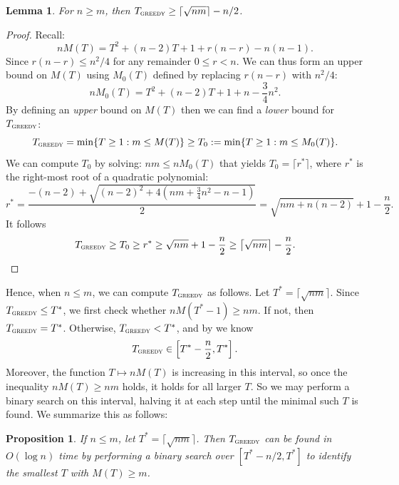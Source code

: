\documentclass{article}
\newcommand{\gr}{\textsc{greedy}}
\newtheorem{lemma}{Lemma}
\newtheorem{proposition}{Proposition}
\begin{document}
\begin{lemma}\label{l: tooth upper sharp}
    For $n \ge m$, then $T_\gr \ge \left\lceil \sqrt{nm}\right\rceil - n/2$.
\end{lemma}
\begin{proof}
    Recall:
    \[
    nM(T) = T^2 + (n-2)T + 1 + r(n-r) - n(n-1).
    \]
    Since $r(n-r) \le n^2/4$ for any remainder $0 \le r < n$. We can thus form an upper bound on $M(T)$ using $M_0(T)$ defined by replacing $r(n-r)$ with $n^2/4$:
    \[
    n M_0(T) = T^2 + (n-2)T + 1 + n - \frac34 n^2.
    \]
    By defining an \textit{upper} bound on $M(T)$ then we can find a \textit{lower} bound for $T_\gr$:
    \begin{equation*}
        T_{\gr} = \min\{T \ge 1: m \le M(T)\} \ge T_0 := \min\{T \ge 1: m \le M_0(T)\}.
    \end{equation*}
We can compute $T_0$ by solving: $nm \le n M_0(T)$ that yields $T_0 = \lceil r^*\rceil$, where $r^*$ is the right-most root of a quadratic polynomial:
\begin{equation*}
    r^* = \frac{-(n-2) + \sqrt{(n-2)^2 + 4(nm + \frac34 n^2 -n-1)}}2 = \sqrt{nm + n(n-2)} +1 - \frac{n}2.
\end{equation*}
It follows
\begin{equation*}
    T_{\gr} \ge T_0 \ge r^* \ge    \sqrt{nm} + 1 - \frac{n}2 \ge \left\lceil \sqrt{nm}\right\rceil- \frac{n}2.
\end{equation*}
\end{proof}

Hence, when $n \le m$, we can compute $T_{\gr}$ as follows. Let 
$T^* = \lceil \sqrt{nm} \rceil$. Since $T_{\gr} \le T^*$, we first check whether 
$nM(T^*-1) \ge nm$. If not, then $T_{\gr} = T^*$. Otherwise, $T_{\gr} < T^*$, and by  we know
\[
T_{\gr} \in 
\left[T^*- \frac{n}{2} , T^* \right].
\]
Moreover, the function $T \mapsto nM(T)$ is increasing in this interval, so once the inequality $nM(T) \ge nm$ holds, it holds for all larger $T$. So we may perform a binary search on this interval, halving it at each step until the minimal such $T$ is found. We summarize this as follows: 

\begin{proposition}\label{prop: tooth runtime}
If $n \le m$, let $T^* = \lceil \sqrt{nm} \rceil$. Then $T_{\gr}$ can be found in $O(\log n)$ time by performing a binary search over $[T^* - n/2, T^*]$ to identify the smallest $T$ with $M(T) \ge m$.
\end{proposition}
\end{document}

